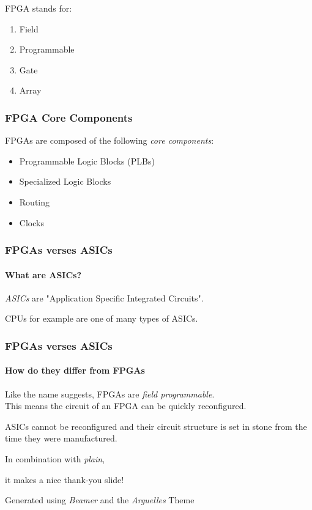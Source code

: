 \documentclass{beamer}
\begin{document}
\begin{frame}
\begin{multicols}{2}
    \AlegreyaExtraBold FPGA \ttfamily stands for:
    \begin{enumerate}
      \item Field
      \item Programmable
      \item Gate
      \item Array
    \end{enumerate}
    
    \vspace*{\fill}

    \end{multicols}
    
  \end{frame}
  
  \begin{frame}
    \frametitle{FPGA Core Components}
    FPGAs are composed of the following \textit{core components}:
    \begin{itemize}
      \item Programmable Logic Blocks (PLBs)
      \item Specialized Logic Blocks
      \item Routing
      \item Clocks
    \end{itemize}
  \end{frame}
  
  \begin{frame}
    \frametitle{FPGAs verses ASICs}
    \framesubtitle{What are ASICs?}

    \textit{ASICs} are "Application Specific Integrated Circuits".

    \vfill

    CPUs for example are one of many types of ASICs.

  \end{frame}
  
  \begin{frame}
    \frametitle{FPGAs verses ASICs}
    \framesubtitle{How do they differ from FPGAs}

    Like the name suggests, FPGAs are \textit{field programmable}. \\
    This means the circuit of an FPGA can be quickly reconfigured.

    \vfill

    ASICs cannot be reconfigured and their circuit structure
    is set in stone from the time they were manufactured.

  \end{frame}

   
  \ThankYou
  \begin{frame}
    In combination with \textit{plain},\par
    it makes a nice thank-you slide!

    \vfill{Generated using \textit{Beamer} and the \textit{Arguelles} Theme}
  \end{frame}
\end{document}
